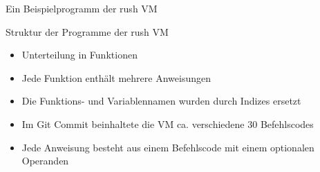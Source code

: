 \begin{frame}{Ein Beispielprogramm der rush VM}
	\hspace{0pt} %
	\vfill
	\vfill
\end{frame}

\begin{frame}{Struktur der Programme der rush VM}
	\begin{itemize}
		\item Unterteilung in Funktionen
		\item Jede Funktion enthält mehrere Anweisungen
		\item Die Funktions- und Variablennamen wurden durch Indizes ersetzt
		\item Im Git Commit \rushCommit{} beinhaltete die VM ca. verschiedene 30 Befehlscodes
		\item Jede Anweisung besteht aus einem Befehlscode mit einem optionalen Operanden
	\end{itemize}
\end{frame}
